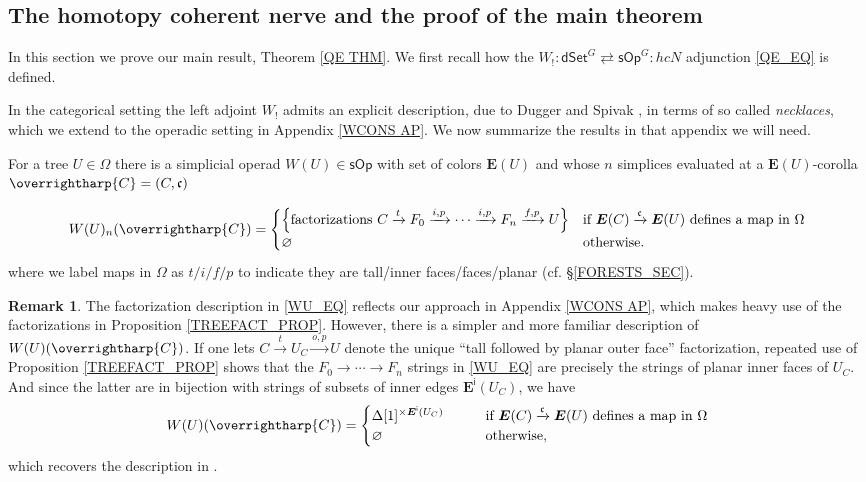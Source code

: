 \documentclass[a4paper,10pt
,draft
]{article}%
\numberwithin{equation}{section}
\numberwithin{figure}{section}
\theoremstyle{definition} %
\newtheorem{remark}[equation]{Remark}%
\newcommand{\vect}[1]{\text{\overrightharp{\ensuremath{#1}}}}
\newcommand{\1}{\ensuremath{\mathbbm 1}}%
\begin{document}
\subsection{The homotopy coherent nerve and the proof of the main theorem}



In this section we prove our main result,
Theorem \ref{QE THM}.
We first recall how the
$W_!\colon \mathsf{dSet}^G 
\rightleftarrows 
\mathsf{sOp}^G \colon hcN$
adjunction \eqref{QE_EQ} is defined.

In the categorical setting
the left adjoint $W_!$ admits 
an explicit description, due to Dugger and Spivak \cite{DS11},
in terms of so called \emph{necklaces},
which we extend to the operadic setting in 
Appendix \ref{WCONS AP}.
We now summarize the results in that appendix we will need.



For a tree $U \in \Omega$ there is 
a simplicial operad
$W(U) \in \mathsf{sOp}$
with set of colors $\boldsymbol{E}(U)$
and whose $n$ simplices evaluated at
a $\boldsymbol{E}(U)$-corolla
$\vect{C} = (C,\mathfrak{c})$


\begin{equation}\label{WU_EQ}
	W(U)_n(\vect C) =
	\begin{cases}
	\left\{\text{factorizations }
	C \xrightarrow{t} 
	F_0 \xrightarrow{i,p} 
	\cdots \xrightarrow{i,p}
	F_n \xrightarrow{f,p} U
	\right\}
&
	\mbox{if $\boldsymbol{E}(C) \xrightarrow{\mathfrak{c}} \boldsymbol{E}(U)$ defines a map in $\Omega$}
\\
	\varnothing
&
	\mbox{otherwise.}
\end{cases}
\end{equation}
where we label maps in $\Omega$ as
$t/i/f/p$
to indicate they are 
tall/inner faces/faces/planar
(cf. \S \ref{FORESTS_SEC}).


\begin{remark}
	The factorization description in \eqref{WU_EQ}
	reflects our approach in Appendix \ref{WCONS AP},
	which makes heavy use of the factorizations in 
	Proposition \ref{TREEFACT_PROP}.
	However, there is a simpler and more familiar description of $W(U)(\vect{C})$.
	If one lets
	$C \xrightarrow{t} U_C \xrightarrow{o,p} U$
	denote the unique ``tall followed by planar outer face'' factorization, 
	repeated use of Proposition \ref{TREEFACT_PROP}
	shows that the 
	$F_0 \to \cdots \to F_n$
	strings in \eqref{WU_EQ}
	are precisely the strings of planar inner faces of $U_C$.
	And since the latter are in bijection with strings of subsets of inner edges $\boldsymbol{E}^{\mathsf{i}}(U_C)$, 
	we have 
\begin{equation}\label{WU_EQ2}
	W(U)(\vect C) =
	\begin{cases}
	\Delta[1]^{\times \boldsymbol{E}^{\mathsf{i}}(U_{C})}
	\qquad
&
	\mbox{if $\boldsymbol{E}(C) \xrightarrow{\mathfrak{c}} \boldsymbol{E}(U)$ defines a map in $\Omega$}
\\
\varnothing
&
	\mbox{otherwise,}
	\end{cases}
\end{equation}
which recovers the description in \cite[\S 4]{CM13b}.
\end{remark}
\end{document}
